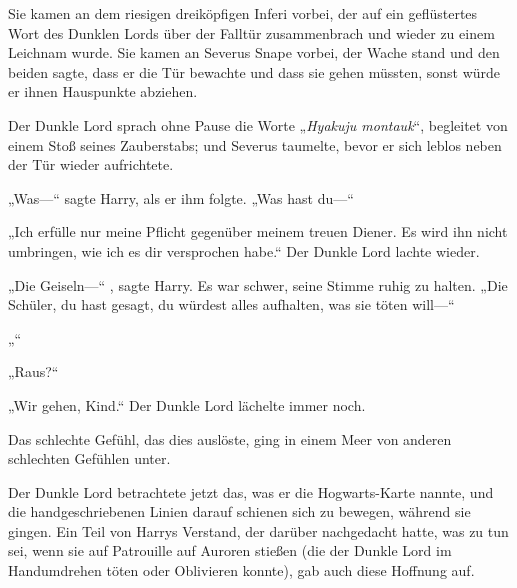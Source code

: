 Sie kamen an dem riesigen dreiköpfigen Inferi vorbei, der auf ein geflüstertes Wort des Dunklen Lords über der Falltür zusammenbrach und wieder zu einem Leichnam wurde.
Sie kamen an Severus Snape vorbei, der Wache stand und den beiden sagte, dass er die Tür bewachte und dass sie gehen müssten, sonst würde er ihnen Hauspunkte abziehen.

Der Dunkle Lord sprach ohne Pause die Worte „\emph{Hyakuju montauk}“, begleitet von einem Stoß seines Zauberstabs; und Severus taumelte, bevor er sich leblos neben der Tür wieder aufrichtete.

„Was—“ sagte Harry, als er ihm folgte. „Was hast du—“

„Ich erfülle nur meine Pflicht gegenüber meinem treuen Diener. Es wird ihn nicht umbringen, wie ich es dir versprochen habe.“
Der Dunkle Lord lachte wieder.

„Die Geiseln—“ , sagte Harry.
Es war schwer, seine Stimme ruhig zu halten.
„Die Schüler, du hast gesagt, du würdest alles aufhalten, was sie töten will—“

„“

„Raus?“

„Wir gehen, Kind.“ Der Dunkle Lord lächelte immer noch.

Das schlechte Gefühl, das dies auslöste, ging in einem Meer von anderen schlechten Gefühlen unter.

Der Dunkle Lord betrachtete jetzt das, was er die Hogwarts-Karte nannte, und die handgeschriebenen Linien darauf schienen sich zu bewegen, während sie gingen. Ein Teil von Harrys Verstand, der darüber nachgedacht hatte, was zu tun sei, wenn sie auf Patrouille auf Auroren stießen (die der Dunkle Lord im Handumdrehen töten oder Oblivieren konnte), gab auch diese Hoffnung auf.

